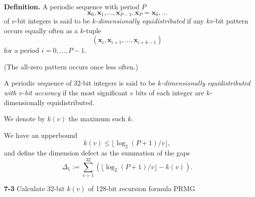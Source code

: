 \documentclass[a4j,12pt,landscape]{jarticle}
\def\bx{{{\mathbf x}}}
\begin{document}
{\bf Definition.} 
A periodic sequence with period $P$
$$\bx_0, \bx_1, \ldots, \bx_{P-1}, \bx_P=\bx_0, \ldots$$
of $v$-bit integers is said to be {\em $k$-dimensionally equidistributed}
if any $kv$-bit pattern occurs equally often as a $k$-tuple
$$
(\bx_i, \bx_{i+1}, \ldots, \bx_{i+k-1})
$$
for a period $i=0,\ldots, P-1$. 

(The all-zero pattern occurs once less often.)

\newpage
A periodic sequence of 32-bit integers is said to be
{\em $k$-dimensionally equidistributed with $v$-bit accuracy}
if the most significant $v$ bits of each integer are
$k$-dimensionally equidistributed. 

We denote by $k(v)$ the maximum such $k$. 

\vskip 5mm
We have an upperbound 
$$
k(v) \leq \lfloor \log_2 (P+1) / v \rfloor, 
$$
and define the dimension defect as the summation of the gaps 
$$
\Delta_1 := \sum_{v=1}^{32}(\lfloor \log_2 (P+1) / v \rfloor -k(v)).
$$

\newpage
{\bf 7-3} Calculate 32-bit $k(v)$ of 128-bit recursion formula PRMG
\end{document}
